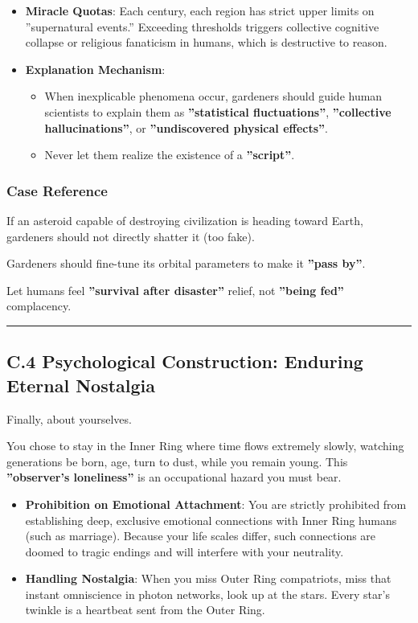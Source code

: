 \begin{itemize}
\item \textbf{Miracle Quotas}: Each century, each region has strict upper limits on ''supernatural events.'' Exceeding thresholds triggers collective cognitive collapse or religious fanaticism in humans, which is destructive to reason.

\item \textbf{Explanation Mechanism}:

    \begin{itemize}
    \item When inexplicable phenomena occur, gardeners should guide human scientists to explain them as \textbf{''statistical fluctuations''}, \textbf{''collective hallucinations''}, or \textbf{''undiscovered physical effects''}.

    \item Never let them realize the existence of a \textbf{''script''}.
    \end{itemize}
\end{itemize}

\subsubsection{Case Reference}

If an asteroid capable of destroying civilization is heading toward Earth, gardeners should not directly shatter it (too fake).

Gardeners should fine-tune its orbital parameters to make it \textbf{''pass by''}.

Let humans feel \textbf{''survival after disaster''} relief, not \textbf{''being fed''} complacency.

\hrule

\subsection{C.4 Psychological Construction: Enduring Eternal Nostalgia}

Finally, about yourselves.

You chose to stay in the Inner Ring where time flows extremely slowly, watching generations be born, age, turn to dust, while you remain young. This \textbf{''observer's loneliness''} is an occupational hazard you must bear.

\begin{itemize}
\item \textbf{Prohibition on Emotional Attachment}: You are strictly prohibited from establishing deep, exclusive emotional connections with Inner Ring humans (such as marriage). Because your life scales differ, such connections are doomed to tragic endings and will interfere with your neutrality.

\item \textbf{Handling Nostalgia}: When you miss Outer Ring compatriots, miss that instant omniscience in photon networks, look up at the stars. Every star's twinkle is a heartbeat sent from the Outer Ring.
\end{itemize}

